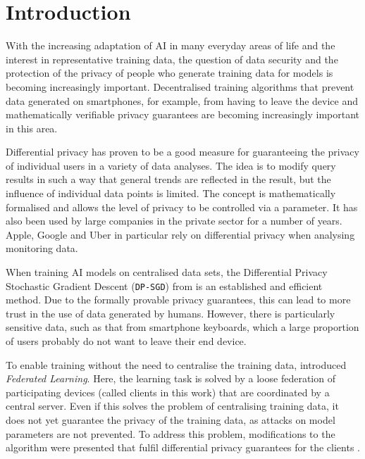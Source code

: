 \chapter{Introduction}

With the increasing adaptation of AI in many everyday areas of life and the interest in representative training data, the question of data security and the protection of the privacy of people who generate training data for models is becoming increasingly important. Decentralised training algorithms that prevent data generated on smartphones, for example, from having to leave the device and mathematically verifiable privacy guarantees are becoming increasingly important in this area.

Differential privacy has proven to be a good measure for guaranteeing the privacy of individual users in a variety of data analyses. The idea is to modify query results in such a way that general trends are reflected in the result, but the influence of individual data points is limited. The concept is mathematically formalised and allows the level of privacy to be controlled via a parameter. It has also been used by large companies in the private sector for a number of years. Apple, Google and Uber in particular rely on differential privacy \parencite{apple:2017, erlingsson:2014, tezapsidis:2017} when analysing monitoring data. 

When training AI models on centralised data sets, the Differential Privacy Stochastic Gradient Descent (\texttt{DP-SGD}) from \textcite{abadi:2016} is an established and efficient method. Due to the formally provable privacy guarantees, this can lead to more trust in the use of data generated by humans. However, there is particularly sensitive data, such as that from smartphone keyboards, which a large proportion of users probably do not want to leave their end device.

To enable training without the need to centralise the training data, \textcite{mcmahan:2016} introduced \textit{Federated Learning}. Here, \glqq{}the learning task is solved by a loose federation of participating devices (called clients in this work) that are coordinated by a central server.\grqq{} \parencite[p.1]{mcmahan:2016} Even if this solves the problem of centralising training data, it does not yet guarantee the privacy of the training data, as attacks on model parameters are not prevented. To address this problem, modifications to the algorithm were presented that fulfil differential privacy guarantees for the clients \parencite{mcmahan:2018, geyer:2017}.

